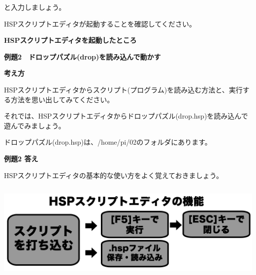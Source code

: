 \documentclass[a4paper,dvipdfmx]{jarticle}
\newcommand\textstyleqwerty[1]{#1}
\begin{document}
\bigskip

と入力しましょう。

HSPスクリプトエディタが起動することを確認してください。


\bigskip


\bigskip


\bigskip


\bigskip


\bigskip


\bigskip


\bigskip


\bigskip


\bigskip

\textstyleqwerty{\textbf{HSPスクリプトエディタを起動したところ}}


\bigskip


\bigskip


\bigskip


\bigskip

\clearpage
\textstyleqwerty{\textbf{例題2　ドロップパズル(drop)を読み込んで動かす}}


\bigskip

{\bfseries
考え方}


\bigskip


\bigskip

HSPスクリプトエディタからスクリプト(プログラム)を読み込む方法と、実行する方法を思い出してみてください。

それでは、HSPスクリプトエディタからドロップパズル(drop.hsp)を読み込んで遊んでみましょう。

ドロップパズル(drop.hsp)は、/home/pi/02のフォルダにあります。


\bigskip


\bigskip

{\bfseries
例題2 答え}


\bigskip

HSPスクリプトエディタの基本的な使い方をよく覚えておきましょう。



\begin{center}
\includegraphics[width=15.533cm,height=4.86cm]{text02-img/text02-img013.png}

\end{center}
\end{document}
